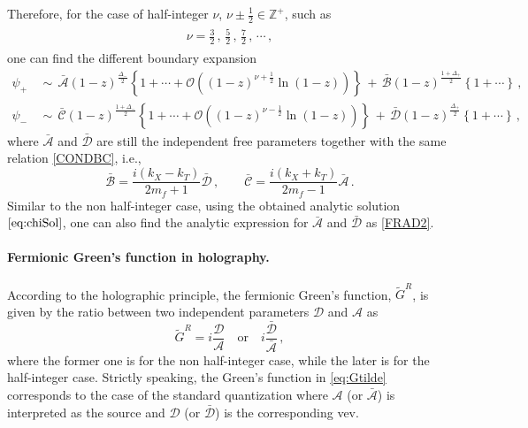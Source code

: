 \documentclass[11pt,a4paper]{article}
\begin{document}
Therefore, for the case of half-integer $\nu$, $\nu \pm \frac{1}{2} \in \mathbb{Z}^{+}$, such as
\begin{align}\label{nurange}
\begin{split}
\nu =   \frac{3}{2}\,,\, \frac{5}{2}\,,\, \frac{7}{2} \,,\, \cdots\,,
\end{split}
\end{align}
one can find the different boundary expansion
\begin{equation}\label{eq:Integer boundary behavior}
\begin{aligned}
    \psi_+  &\,\sim\,  \bar{\mathcal{A}} (1-z)^{\frac{\Delta_{-}}{2}} \left\{1 + \cdots +\mathcal{O}\left( (1-z)^{\nu+\frac{1}{2}} \ln{(1-z)}\right)  \right\} \,+\, \bar{\mathcal{B}} (1-z)^{\frac{1+\Delta_{+}}{2}} \left\{1+\cdots\right\} \,,
    \\
    \psi_-  &\,\sim\, \bar{\mathcal{C}} (1-z)^{\frac{1+\Delta_{-}}{2}} \left\{1 +\cdots+ \mathcal{O}\left( (1-z)^{\nu-\frac{1}{2}} \ln{(1-z)}\right) \right\} \,+\, \bar{\mathcal{D}} (1-z)^{\frac{\Delta_{+}}{2}} \left\{1+\cdots\right\}   \,,
\end{aligned}
\end{equation}
where $\bar{\mathcal{A}}$ and $\bar{\mathcal{D}}$ are still the independent free parameters together with the same relation \eqref{CONDBC}, i.e.,
\begin{equation}\label{CONDBC2}
    \bar{\mathcal{B}}=\frac{i(k_X-k_T)}{2m_f+1} \bar{\mathcal{D}}\,, \qquad
    \bar{\mathcal{C}}=\frac{i(k_X+k_T)}{2m_f-1} \bar{\mathcal{A}}\,.
\end{equation}
Similar to the non half-integer case, using the obtained analytic solution $\eqref{eq:chiSol}$, one can also find the analytic expression for $\bar{\mathcal{A}}$ and $\bar{\mathcal{D}}$ as \eqref{FRAD2}.


\paragraph{Fermionic Green's function in holography.}
According to the holographic principle, the fermionic Green's function, $\tilde{G}^R$, is given by the ratio between two independent parameters $\mathcal{D}$ and $\mathcal{A}$ as  
\begin{equation}\label{eq:Gtilde}
    \tilde{G}^R = i \frac{\mathcal{D}}{\mathcal{A}}  \quad \text{or} \quad i \frac{\bar{\mathcal{D}}}{\bar{\mathcal{A}}} \,,
\end{equation}
where the former one is for the non half-integer case, while the later is for the half-integer case.
Strictly speaking, the Green's function in \eqref{eq:Gtilde} corresponds to the case of the standard quantization where $\mathcal{A}$ (or $\bar{\mathcal{A}}$) is interpreted as the source and $\mathcal{D}$ (or $\bar{\mathcal{D}}$) is the corresponding vev. 
\end{document}
